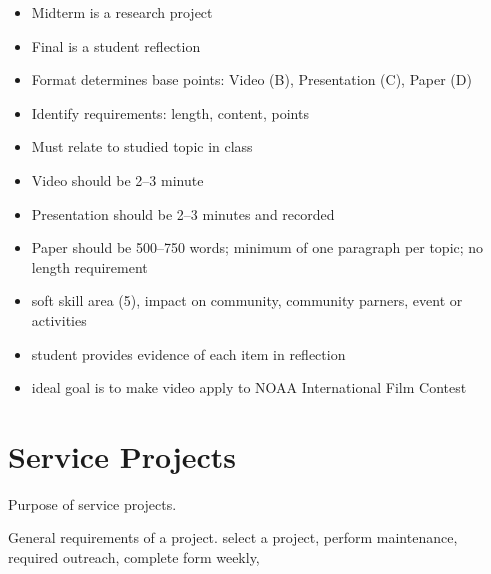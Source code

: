 \documentclass[letterpaper,10pt]{memoir}
\begin{document}
\begin{itemize}[label=$-$,nosep]
\item Midterm is a research project
\item Final is a student reflection
\item Format determines base points: Video (B), Presentation (C), Paper (D)
\item Identify requirements: length, content, points
\item Must relate to studied topic in class
\item Video should be 2--3 minute
\item Presentation should be 2--3 minutes and recorded
\item Paper should be 500--750 words; minimum of one paragraph per topic; no length requirement
\item soft skill area (5), impact on community, community parners, event or activities
\item student provides evidence of each item in reflection
\item ideal goal is to make video apply to NOAA International Film Contest
\end{itemize}






\newpage
\section*{Service Projects}

Purpose of service projects.

General requirements of a project.
select a project,
perform maintenance,
required outreach,
complete form weekly,
\end{document}
